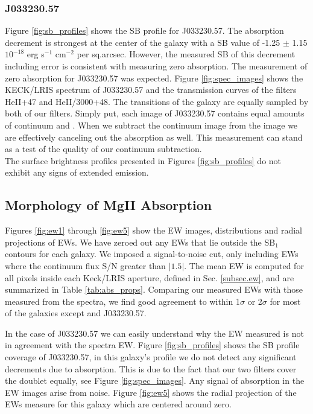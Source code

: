 \documentclass[twocolumn]{aastex61}
\begin{document}
\subsubsection{J033230.57} 
Figure \ref{fig:sb_profiles} shows the SB profile for J033230.57. The absorption decrement is strongest at the center of the galaxy with a SB value of -1.25 $\pm$ 1.15 $10^{-18}$ erg s$^{-1}$ cm$^{-2}$ per sq.arcsec. However, the measured SB of this decrement including error is consistent with measuring zero absorption. The measurement of zero absorption for J033230.57 was expected. Figure \ref{fig:spec_images} shows the KECK/LRIS spectrum of J033230.57 and the transmission curves of the filters HeII+47 and HeII/3000+48. The  transitions of the galaxy are equally sampled by both of our filters. Simply put, each image of J033230.57 contains equal amounts of continuum and . When we subtract the continuum image from the  image we are effectively canceling out the  absorption as well. This measurement can stand as a test of the quality of our continuum subtraction. \\

The surface brightness profiles presented in Figures \ref{fig:sb_profiles} do not exhibit any signs of extended  emission. \\

\subsection{Morphology of MgII Absorption}

Figures \ref{fig:ew1} through \ref{fig:ew5} show the EW images, distributions and radial projections of  EWs. We have zeroed out any EWs that lie outside the SB$_1$ contours for each galaxy. We imposed a signal-to-noise cut, only including EWs where the continuum flux S/N greater than $|1.5|$. The mean EW is computed for all pixels inside each Keck/LRIS aperture, defined in Sec. \ref{subsec.ew}, and are summarized in Table \ref{tab:abs_props}. Comparing our measured EWs with those measured from the spectra, we find good agreement to within 1$\sigma$ or 2$\sigma$ for most of the galaxies except and J033230.57.

In the case of J033230.57 we can easily understand why the EW measured is not in agreement with the spectra EW. Figure \ref{fig:sb_profiles}  shows the SB profile coverage of J033230.57, in this galaxy's profile we do not detect any significant decrements due to absorption. This is due to the fact that our two filters cover the  doublet equally, see Figure  \ref{fig:spec_images}. Any signal of absorption in the EW images arise from noise. Figure \ref{fig:ew5} shows the radial projection of the EWs measure for this galaxy which are centered around zero.
\end{document}
